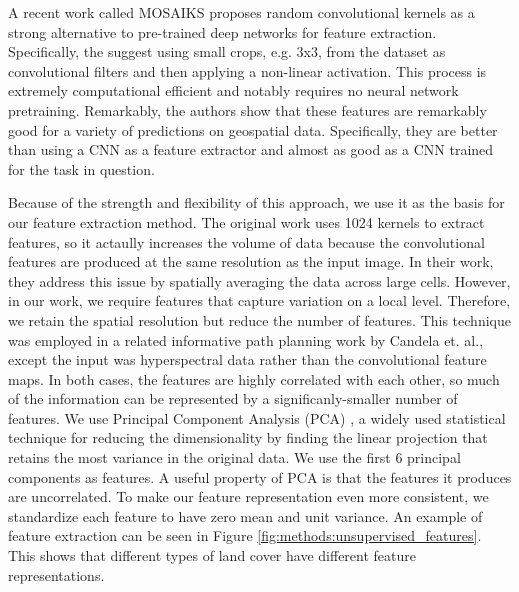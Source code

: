 A recent work called MOSAIKS \cite{Rolf2021} proposes random convolutional kernels as a strong alternative to pre-trained deep networks for feature extraction. Specifically, the suggest using small crops, e.g. 3x3, from the dataset as convolutional filters and then applying a non-linear activation. This process is extremely computational efficient and notably requires no neural network pretraining. Remarkably, the authors show that these features are remarkably good for a variety of predictions on geospatial data. Specifically, they are better than using a CNN as a feature extractor and almost as good as a CNN trained for the task in question.

Because of the strength and flexibility of this approach, we use it as the basis for our feature extraction method. The original work uses 1024 kernels to extract features, so it actaully increases the volume of data because the convolutional features are produced at the same resolution as the input image. In their work, they address this issue by spatially averaging the data across large cells. However, in our work, we require features that capture variation on a local level. Therefore, we retain the spatial resolution but reduce the number of features. This technique was employed in a related informative path planning work by Candela et. al., except the input was hyperspectral data rather than the convolutional feature maps. In both cases, the features are highly correlated with each other, so much of the information can be represented by a significanly-smaller number of features. We use Principal Component Analysis (PCA) \cite{Jollife2016PrincipalDevelopments}, a widely used statistical technique for reducing the dimensionality by finding the linear projection that retains the most variance in the original data. We use the first 6 principal components as features. A useful property of PCA is that the features it produces are uncorrelated. To make our feature representation even more consistent, we standardize each feature to have zero mean and unit variance. An example of feature extraction can be seen in Figure \ref{fig:methods:unsupervised_features}. This shows that different types of land cover have different feature representations.

